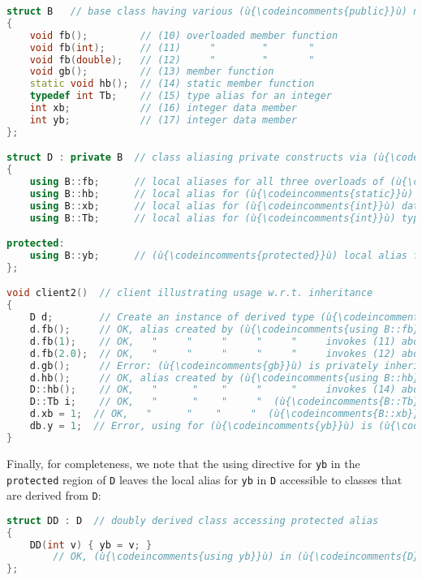 \begin{lstlisting}[language=C++]
struct B   // base class having various (ù{\codeincomments{public}}ù) named entities
{
    void fb();         // (10) overloaded member function
    void fb(int);      // (11)     "        "       "
    void fb(double);   // (12)     "        "       "
    void gb();         // (13) member function
    static void hb();  // (14) static member function
    typedef int Tb;    // (15) type alias for an integer
    int xb;            // (16) integer data member
    int yb;            // (17) integer data member
};

struct D : private B  // class aliasing private constructs via (ù{\codeincomments{using}}ù)
{
    using B::fb;      // local aliases for all three overloads of (ù{\codeincomments{fb}}ù)
    using B::hb;      // local alias for (ù{\codeincomments{static}}ù) member function (ù{\codeincomments{hb}}ù)
    using B::xb;      // local alias for (ù{\codeincomments{int}}ù) data member (ù{\codeincomments{xb}}ù)
    using B::Tb;      // local alias for (ù{\codeincomments{int}}ù) type alias

protected:
    using B::yb;      // (ù{\codeincomments{protected}}ù) local alias for (ù{\codeincomments{int}}ù) data member (ù{\codeincomments{yb}}ù)
};

void client2()  // client illustrating usage w.r.t. inheritance
{
    D d;        // Create an instance of derived type (ù{\codeincomments{D}}ù).
    d.fb();     // OK, alias created by (ù{\codeincomments{using B::fb}}ù)  invokes (10) above.
    d.fb(1);    // OK,   "     "     "     "     "     invokes (11) above.
    d.fb(2.0);  // OK,   "     "     "     "     "     invokes (12) above.
    d.gb();     // Error: (ù{\codeincomments{gb}}ù) is privately inherited without using declaration.
    d.hb();     // OK, alias created by (ù{\codeincomments{using B::hb}}ù)  invokes (14) above.
    D::hb();    // OK,   "      "    "     "     "     invokes (14) above.
    D::Tb i;    // OK,   "      "    "     "  (ù{\codeincomments{B::Tb}}ù)  aliases (15) above.
    d.xb = 1;  // OK,   "      "    "     "  (ù{\codeincomments{B::xb}}ù)  assigns (16) above.
    db.y = 1;  // Error, using for (ù{\codeincomments{yb}}ù) is (ù{\codeincomments{protected}}ù), not (ù{\codeincomments{public}}ù).
}
\end{lstlisting}
    
\noindent Finally, for completeness, we note that the using directive for
\texttt{yb} in the \texttt{protected} region of \texttt{D} leaves the
local alias for \texttt{yb} in \texttt{D} accessible to classes that are
derived from \texttt{D}:

\begin{lstlisting}[language=C++]
struct DD : D  // doubly derived class accessing protected alias
{
    DD(int v) { yb = v; }
        // OK, (ù{\codeincomments{using yb}}ù) in (ù{\codeincomments{D}}ù) exposes (ù{\codeincomments{protected}}ù) alias; assigns (17).
};
\end{lstlisting}
    
